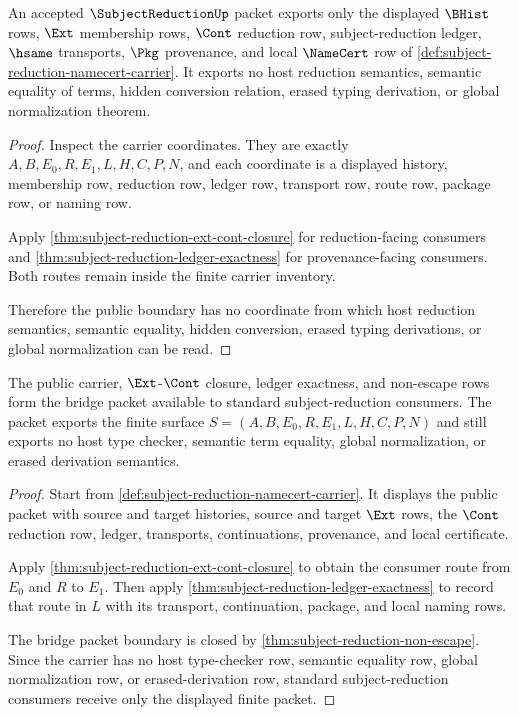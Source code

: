 \begin{theorem}
\label{thm:subject-reduction-non-escape}
An accepted $\SubjectReductionUp$ packet exports only the displayed $\BHist$ rows, $\Ext$ membership rows, $\Cont$ reduction row, subject-reduction ledger, $\hsame$ transports, $\Pkg$ provenance, and local $\NameCert$ row of \autoref{def:subject-reduction-namecert-carrier}. It exports no host reduction semantics, semantic equality of terms, hidden conversion relation, erased typing derivation, or global normalization theorem.
\end{theorem}
\begin{proof}
Inspect the carrier coordinates. They are exactly $A,B,E_0,R,E_1,L,H,C,P,N$, and each coordinate is a displayed history, membership row, reduction row, ledger row, transport row, route row, package row, or naming row.

Apply \autoref{thm:subject-reduction-ext-cont-closure} for reduction-facing consumers and \autoref{thm:subject-reduction-ledger-exactness} for provenance-facing consumers. Both routes remain inside the finite carrier inventory.

Therefore the public boundary has no coordinate from which host reduction semantics, semantic equality, hidden conversion, erased typing derivations, or global normalization can be read.
\end{proof}

\begin{theorem}
\label{thm:subject-reduction-bridge-packet-scope}
The public carrier, $\Ext$-$\Cont$ closure, ledger exactness, and non-escape rows form the bridge packet available to standard subject-reduction consumers. The packet exports the finite surface $S=(A,B,E_0,R,E_1,L,H,C,P,N)$ and still exports no host type checker, semantic term equality, global normalization, or erased derivation semantics.
\end{theorem}
\begin{proof}
Start from \autoref{def:subject-reduction-namecert-carrier}. It displays the public packet with source and target histories, source and target $\Ext$ rows, the $\Cont$ reduction row, ledger, transports, continuations, provenance, and local certificate.

Apply \autoref{thm:subject-reduction-ext-cont-closure} to obtain the consumer route from $E_0$ and $R$ to $E_1$. Then apply \autoref{thm:subject-reduction-ledger-exactness} to record that route in $L$ with its transport, continuation, package, and local naming rows.

The bridge packet boundary is closed by \autoref{thm:subject-reduction-non-escape}. Since the carrier has no host type-checker row, semantic equality row, global normalization row, or erased-derivation row, standard subject-reduction consumers receive only the displayed finite packet.
\end{proof}

